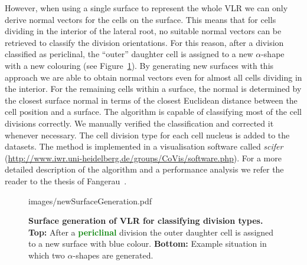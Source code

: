\documentclass[11pt,a4paper, final]{article}
\begin{document}
%
However, when using a single surface to represent the whole VLR we can only derive normal vectors for the cells on the surface. This means that for cells dividing in the interior of the lateral root, no suitable normal vectors can be retrieved to classify the division orientations. For this reason, after a division classified as periclinal, the ``outer'' daughter cell is assigned to a new $\alpha$-shape with a new colouring (see Figure~\ref{fig:newSurfaceGeneration}). By generating new surfaces with this approach we are able to obtain normal vectors even for almost all cells dividing in the interior. For the remaining cells within a surface, the normal is determined by the closest surface normal in terms of the closest Euclidean distance between the cell position and a surface. The algorithm is capable of classifying most of the cell divisions correctly. We manually verified the classification and corrected it whenever necessary. The cell division type for each cell nucleus is added to the datasets. The method is implemented in a visualisation software called \textit{scifer} (\href{http://www.iwr.uni-heidelberg.de/groups/CoVis/software.php}{http://www.iwr.uni-heidelberg.de/groups/CoVis/software.php}). For a more detailed description of the algorithm and a performance analysis we refer the reader to the thesis of Fangerau~\cite[chapter 4]{FangerauDiss_2015}.
%
\begin{figure}[htbp]
	\begin{center}
		\begin{overpic}[width=0.9\linewidth]{images/newSurfaceGeneration.pdf}
		\end{overpic}
\caption[]
{
{\bf Surface generation of VLR for classifying division types. Top:} After a \textcolor{green}{\textbf{periclinal}} division the outer daughter cell is assigned to a new surface with blue colour. {\bf Bottom:} Example situation in which two $\alpha$-shapes are generated.
}
	\label{fig:newSurfaceGeneration}
	\end{center}
\end{figure}
%
\end{document}
